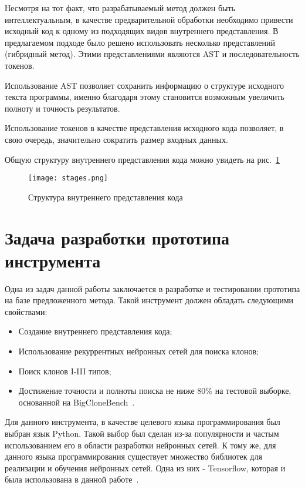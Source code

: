 Несмотря на тот факт, что разрабатываемый метод должен быть интеллектуальным, в качестве предварительной обработки необходимо привести исходный код к одному из подходящих видов внутреннего представления. В предлагаемом подходе было решено использовать несколько представлений (гибридный метод). Этими представлениями являются AST и последовательность токенов. 

Использование AST позволяет сохранить информацию о структуре исходного текста программы, именно благодаря этому становится возможным увеличить полноту и точность результатов.

Использование токенов в качестве представления исходного кода позволяет, в свою очередь, значительно сократить размер входных данных.

Общую структуру внутреннего представления кода можно увидеть на рис.~\ref{fig:stages}

\begin{figure}[htbp]
\centering
\texttt{[image: stages.png]}
\caption{Структура внутреннего представления кода}
\label{fig:stages}
\end{figure}

\section{Задача разработки прототипа инструмента}

Одна из задач данной работы заключается в разработке и тестировании прототипа на базе предложенного метода. Такой инструмент должен обладать следующими свойствами:
\begin{itemize}
\setlength\itemsep{0mm}
\item Создание внутреннего представления кода;
\item Использование рекуррентных нейронных сетей для поиска клонов;
\item Поиск клонов I-III типов;
\item Достижение точности и полноты поиска не ниже 80\% на тестовой выборке, основанной на BigCloneBench~\cite{bcb}.
\end{itemize}

Для данного инструмента, в качестве целевого языка программирования был выбран язык Python. Такой выбор был сделан из-за популярности и частым использованием его в области разработки нейронных сетей. К тому же, для данного языка программирования существует множество библиотек для реализации и обучения нейронных сетей. Одна из них - Tensorflow, которая и была использована в данной работе~\cite{tf}.

